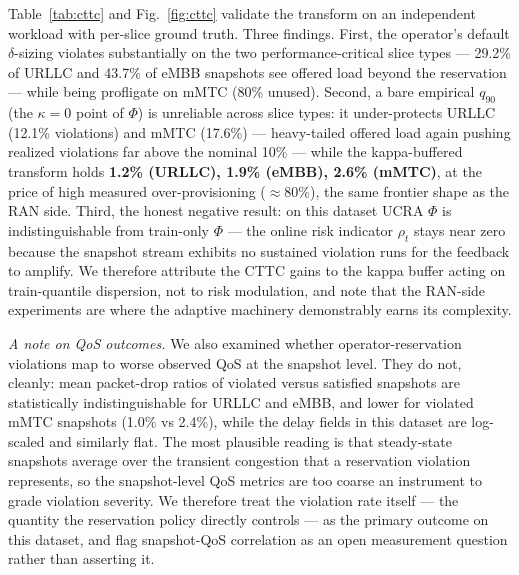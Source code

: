 Table~\ref{tab:cttc} and Fig.~\ref{fig:cttc} validate the transform
on an independent workload with per-slice ground truth. Three
findings. First, the operator's default $\delta$-sizing violates
substantially on the two performance-critical slice types --- 29.2\%
of URLLC and 43.7\% of eMBB snapshots see offered load beyond the
reservation --- while being profligate on mMTC (80\% unused). Second,
a bare empirical $q_{90}$ (the $\kappa = 0$ point of $\Phi$) is
unreliable across slice types: it under-protects URLLC (12.1\%
violations) and mMTC (17.6\%) --- heavy-tailed offered load again
pushing realized violations far above the nominal 10\% --- while the
kappa-buffered transform holds \textbf{1.2\% (URLLC), 1.9\% (eMBB),
2.6\% (mMTC)}, at the price of high measured over-provisioning
($\approx$80\%), the same frontier shape as the RAN side. Third, the
honest negative result: on this dataset UCRA $\Phi$ is
indistinguishable from train-only $\Phi$ --- the online risk
indicator $\rho_t$ stays near zero because the snapshot stream
exhibits no sustained violation runs for the feedback to amplify.
We therefore attribute the CTTC gains to the kappa buffer acting on
train-quantile dispersion, not to risk modulation, and note that the
RAN-side experiments are where the adaptive machinery demonstrably
earns its complexity.

\emph{A note on QoS outcomes.} We also examined whether
operator-reservation violations map to worse observed QoS at the
snapshot level. They do not, cleanly: mean packet-drop ratios of
violated versus satisfied snapshots are statistically
indistinguishable for URLLC and eMBB, and lower for violated mMTC
snapshots (1.0\% vs 2.4\%), while the delay fields in this dataset
are log-scaled and similarly flat. The most plausible reading is
that steady-state snapshots average over the transient congestion
that a reservation violation represents, so the snapshot-level QoS
metrics are too coarse an instrument to grade violation severity.
We therefore treat the violation rate itself --- the quantity the
reservation policy directly controls --- as the primary outcome on
this dataset, and flag snapshot-QoS correlation as an open
measurement question rather than asserting it.
